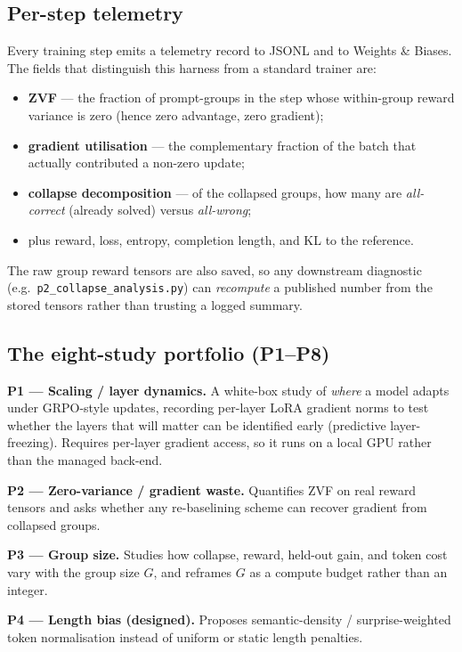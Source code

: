 \documentclass[11pt,a4paper]{article}
\begin{document}
\subsection{Per-step telemetry}
Every training step emits a telemetry record to JSONL and to Weights \& Biases.
The fields that distinguish this harness from a standard trainer are:
\begin{itemize}[leftmargin=1.4em,itemsep=1pt]
  \item \textbf{ZVF} --- the fraction of prompt-groups in the step whose
  within-group reward variance is zero (hence zero advantage, zero gradient);
  \item \textbf{gradient utilisation} --- the complementary fraction of the batch
  that actually contributed a non-zero update;
  \item \textbf{collapse decomposition} --- of the collapsed groups, how many are
  \emph{all-correct} (already solved) versus \emph{all-wrong};
  \item plus reward, loss, entropy, completion length, and KL to the reference.
\end{itemize}
The raw group reward tensors are also saved, so any downstream diagnostic
(e.g.\ \texttt{p2\_collapse\_analysis.py}) can \emph{recompute} a published number
from the stored tensors rather than trusting a logged summary.

\subsection{The eight-study portfolio (P1--P8)}

\textbf{P1 --- Scaling / layer dynamics.} A white-box study of \emph{where} a model
adapts under GRPO-style updates, recording per-layer LoRA gradient norms to test
whether the layers that will matter can be identified early (predictive
layer-freezing). Requires per-layer gradient access, so it runs on a local GPU
rather than the managed back-end.

\textbf{P2 --- Zero-variance / gradient waste.} Quantifies ZVF on real reward
tensors and asks whether any re-baselining scheme can recover gradient from
collapsed groups.

\textbf{P3 --- Group size.} Studies how collapse, reward, held-out gain, and token
cost vary with the group size $G$, and reframes $G$ as a compute budget rather
than an integer.

\textbf{P4 --- Length bias (designed).} Proposes semantic-density / surprise-weighted
token normalisation instead of uniform or static length penalties.
\end{document}
